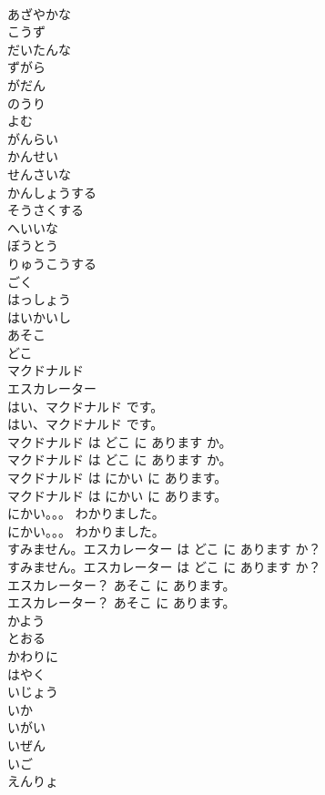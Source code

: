 \documentclass[8pt]{extreport}
\begin{document}
\begin{CJK}{UTF8}{min}
\\	あざやかな
\\	こうず
\\	だいたんな
\\	ずがら
\\	がだん
\\	のうり
\\	よむ
\\	がんらい
\\	かんせい
\\	せんさいな
\\	かんしょうする
\\	そうさくする
\\	へいいな
\\	ぼうとう
\\	りゅうこうする
\\	ごく
\\	はっしょう
\\	はいかいし
\\	あそこ
\\	どこ
\\	マクドナルド
\\	エスカレーター
\\	はい、マクドナルド です。	
\\	はい、マクドナルド です。 
\\	マクドナルド は どこ に あります か。	
\\	マクドナルド は どこ に あります か。 
\\	マクドナルド は にかい に あります。	
\\	マクドナルド は にかい に あります。 
\\	にかい。。。 わかりました。	
\\	にかい。。。 わかりました。 
\\	すみません。エスカレーター は どこ に あります か？	
\\	すみません。エスカレーター は どこ に あります か？ 
\\	エスカレーター？ あそこ に あります。	
\\	エスカレーター？ あそこ に あります。 
\\	かよう
\\	とおる
\\	かわりに
\\	はやく
\\	いじょう
\\	いか
\\	いがい
\\	いぜん
\\	いご
\\	えんりょ

\end{CJK}
\end{document}
